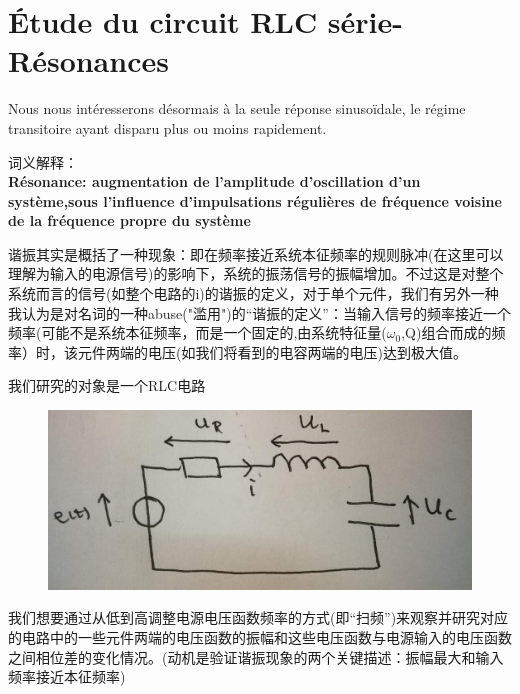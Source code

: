 \documentclass[12pt]{book}
\theoremstyle{definition}\newtheorem{dfn}{Définition}[chapter]
\theoremstyle{plain}\newtheorem{thm}{Théorème}[chapter]
\theoremstyle{plain}\newtheorem{prp}{Proposition}[chapter]
\theoremstyle{plain}\newtheorem{lem}{\bf Lemme}[chapter]
\theoremstyle{plain}\newtheorem{axm}{\bf Axiome}[chapter]
\theoremstyle{plain}\newtheorem{lmm}{\bf Lemme}[chapter]
\theoremstyle{plain}\newtheorem{cor}{\bf Corollaire}[chapter]
\theoremstyle{remark}\newtheorem{rem}{Remarque}[chapter]
\begin{document}
\chapter{Étude du circuit RLC série-Résonances}
Nous nous intéresserons désormais à la seule réponse sinusoïdale, le régime
transitoire ayant disparu plus ou moins rapidement.

词义解释：\\
\textbf{Résonance: augmentation de l'amplitude d'oscillation d'un système,sous l'influence d'impulsations régulières de fréquence voisine de la fréquence propre du système}

谐振其实是概括了一种现象：即在{\color{red}频率接近系统本征频率}的规则脉冲(在这里可以理解为输入的电源信号)的影响下，系统的振荡信号的振幅增加。不过这是对整个系统而言的信号(如整个电路的i)的谐振的定义，对于单个元件，我们有另外一种我认为是对名词的一种abuse("滥用")的“谐振的定义”：当输入信号的频率接近一个频率(可能不是系统本征频率，而是一个固定的,由系统特征量($\omega_0$,Q)组合而成的频率）时，该元件两端的电压(如我们将看到的电容两端的电压)达到极大值。

我们研究的对象是一个RLC电路
\begin{figure}[H]
	\centering
	\includegraphics[scale=0.1]{image//Etude du circuit RLC serie-Resonances//1}
\end{figure}
我们想要通过从低到高调整电源电压函数频率的方式(即“扫频”)来观察并研究对应的电路中的一些元件两端的电压函数的振幅和这些电压函数与电源输入的电压函数之间相位差的变化情况。(动机是验证谐振现象的两个关键描述：振幅最大和输入频率接近本征频率)
\end{document}
